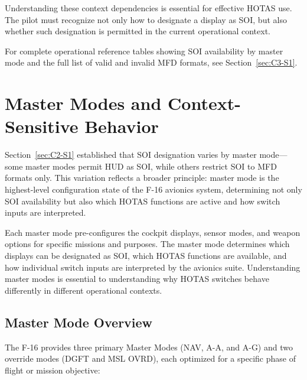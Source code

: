 \documentclass[11pt, a4paper, twoside]{report}
\begin{document}
Understanding these context dependencies is essential for effective HOTAS use. The pilot must recognize not only how to designate a display as SOI, but also whether such designation is permitted in the current operational context.

For complete operational reference tables showing SOI availability by master mode and the full list of valid and invalid MFD formats, see Section~\ref{sec:C3-S1}.

\section{Master Modes and Context-Sensitive Behavior}
\label{sec:C2-S2}

Section~\ref{sec:C2-S1} established that SOI designation varies by master mode—some master modes permit HUD as SOI, while others restrict SOI to MFD formats only. This variation reflects a broader principle: master mode is the highest-level configuration state of the F-16 avionics system, determining not only SOI availability but also which HOTAS functions are active and how switch inputs are interpreted.

Each master mode pre-configures the cockpit displays, sensor modes, and weapon options for specific missions and purposes. The master mode determines which displays can be designated as SOI, which HOTAS functions are available, and how individual switch inputs are interpreted by the avionics suite. Understanding master modes is essential to understanding why HOTAS switches behave differently in different operational contexts.

\subsection{Master Mode Overview}
\label{sec:C2-S2-S1}

The F-16 provides three primary Master Modes (NAV, A-A, and A-G) and two override modes (DGFT and MSL OVRD), each optimized for a specific phase of flight or mission objective:
\end{document}
